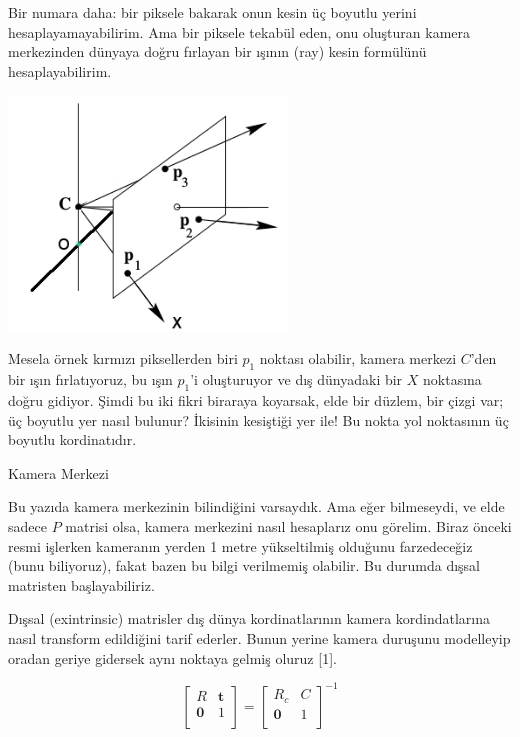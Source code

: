 \documentclass[12pt,fleqn]{article}\usepackage{../../common}
\begin{document}
Bir numara daha: bir piksele bakarak onun kesin üç boyutlu yerini
hesaplayamayabilirim. Ama bir piksele tekabül eden, onu oluşturan kamera
merkezinden dünyaya doğru fırlayan bir ışının (ray) kesin formülünü
hesaplayabilirim.

\includegraphics[width=20em]{vision_80ray_01.png}

Mesela örnek kırmızı piksellerden biri $p_1$ noktası olabilir, kamera
merkezi $C$'den bir ışın fırlatıyoruz, bu ışın $p_1$'i oluşturuyor ve dış
dünyadaki bir $X$ noktasına doğru gidiyor.  Şimdi bu iki fikri biraraya
koyarsak, elde bir düzlem, bir çizgi var; üç boyutlu yer nasıl bulunur?
İkisinin kesiştiği yer ile! Bu nokta yol noktasının üç boyutlu
kordinatıdır.

Kamera Merkezi

Bu yazıda kamera merkezinin bilindiğini varsaydık. Ama eğer bilmeseydi, ve
elde sadece $P$ matrisi olsa, kamera merkezini nasıl hesaplarız onu
görelim. Biraz önceki resmi işlerken kameranın yerden 1 metre yükseltilmiş
olduğunu farzedeceğiz (bunu biliyoruz), fakat bazen bu bilgi verilmemiş
olabilir. Bu durumda dışsal matristen başlayabiliriz.

Dışsal (exintrinsic) matrisler dış dünya kordinatlarının kamera
kordindatlarına nasıl transform edildiğini tarif ederler. Bunun yerine
kamera duruşunu modelleyip oradan geriye gidersek aynı noktaya gelmiş
oluruz [1].

$$ 
\left[
\begin{array}{c|c} R & \boldsymbol{t} \\ \hline  \boldsymbol{0} & 1 \\ \end{array}
\right]
 = 
\left[ \begin{array}{c|c} R_c & C \\ \hline \boldsymbol{0} & 1 \\ \end{array}
\right]^{-1} 
$$
\end{document}

